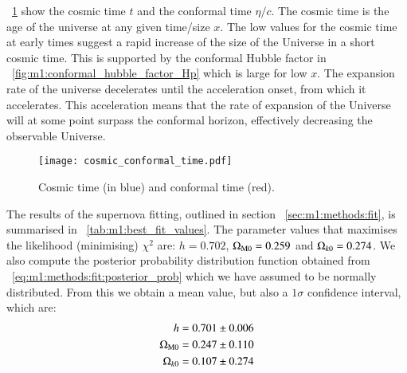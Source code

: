     ~\cref{fig:m1:cosmic_conformal_time} show the cosmic time $t$ and the conformal time $\eta/c$. The cosmic time is the age of the universe at any given time/size $x$. The low values for the cosmic time at early times suggest a rapid increase of the size of the Universe in a short cosmic time. This is supported by the conformal Hubble factor in ~\cref{fig:m1:conformal_hubble_factor_Hp} which is large for low $x$. The expansion rate of the universe decelerates until the acceleration onset, from which it accelerates. This acceleration means that the rate of expansion of the Universe will at some point surpass the conformal horizon, effectively decreasing the observable Universe. 

    \begin{figure}
        \texttt{[image: cosmic\_conformal\_time.pdf]}
        \caption{Cosmic time (in blue) and conformal time (red).}
        \label{fig:m1:cosmic_conformal_time}
    \end{figure}

    The results of the supernova fitting, outlined in section ~\cref{sec:m1:methods:fit}, is summarised in ~\cref{tab:m1:best_fit_values}. The parameter values that maximises the likelihood (minimising) $\chi^2$ are: $h=0.702$, $\Omega_\mathrm{M0} = 0.259$ and $\Omega_{k0} = 0.274$. We also compute the posterior probability distribution function obtained from ~\cref{eq:m1:methods:fit:posterior_prob} which we have assumed to be normally distributed. From this we obtain a mean value, but also a $1\sigma$ confidence interval, which are:
    \begin{equation}\label{eq:m1:results:posterior_results}
        \begin{split}
            h &= 0.701\pm0.006 \\
            \Omega_\mathrm{M0} &= 0.247\pm0.110 \\
            \Omega_{k0} &= 0.107 \pm 0.274
        \end{split}
    \end{equation}
    
